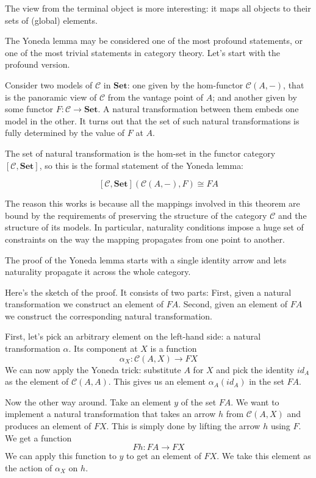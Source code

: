 \documentclass[DaoFP]{subfiles}
\begin{document}
The view from the terminal object is more interesting: it maps all objects to their sets of (global) elements. 

The Yoneda lemma may be considered one of the most profound statements, or one of the most trivial statements in category theory. Let's start with the profound version. 

Consider two models of $\mathcal{C}$ in $\mathbf{Set}$: one given by the hom-functor  $\mathcal{C}(A, -)$, that is the panoramic view of $\mathcal{C}$ from the vantage point of $A$; and another given by some functor $F \colon \mathcal{C} \to \mathbf{Set}$. A natural transformation between them embeds one model in the other. It turns out that the set of such natural transformations is fully determined by the value of $F$ at $A$.

The set of natural transformation is the hom-set in the functor category $[\mathcal{C}, \mathbf{Set}]$, so this is the formal statement of the Yoneda lemma:

\[ [\mathcal{C}, \mathbf{Set}]( \mathcal{C}(A, -), F) \cong F A \]

The reason this works is because all the mappings involved in this theorem are bound by the requirements of preserving the structure of the category $\mathcal{C}$ and the structure of its models. In particular, naturality conditions impose a huge set of constraints on the way the mapping propagates from one point to another. 

The proof of the Yoneda lemma starts with a single identity arrow and lets naturality propagate it across the whole category.

Here's the sketch of the proof. It consists of two parts: First, given a natural transformation we construct an element of $F A$. Second, given an element of $F A$ we construct the corresponding natural transformation. 

First, let's pick an arbitrary element on the left-hand side: a natural transformation $\alpha$. Its component at $X$ is a function
\[ \alpha_X \colon \mathcal{C}(A, X) \to F X \]
We can now apply the Yoneda trick: substitute $A$ for $X$ and pick the identity $id_A$ as the element of $\mathcal{C}(A, A)$. This gives us an element $\alpha_A (id_A)$ in the set $F A$.

Now the other way around. Take an element $y$ of the set $F A$. We want to implement a natural transformation that takes an arrow $h$ from $ \mathcal{C}(A, X)$ and produces an element of $F X$. This is simply done by lifting the arrow $h$ using $F$. We get a function
\[F h \colon F A \to F X \]
We can apply this function to $y$ to get an element of $F X$. We take this element as the action of $\alpha_X$ on $h$.
\end{document}
